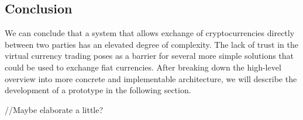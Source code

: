 \subsection{Conclusion}

We can conclude that a system that allows exchange of cryptocurrencies directly between two parties has an elevated degree of complexity. The lack of trust in the virtual currency trading poses as a barrier for several more simple solutions that could be used to exchange fiat currencies. After breaking down the high-level overview into more concrete and implementable architecture, we will describe the development of a prototype in the following section.

//Maybe elaborate a little?